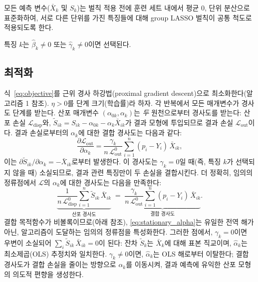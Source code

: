 \documentclass[a4paper,11pt]{article}
\begin{document}
모든 예측 변수($\bar X_k$ 및 $S_k$)는 벌칙 적용 전에 훈련 세트 내에서 평균 0, 단위 분산으로 표준화하여, 서로 다른 단위를 가진 특징들에 대해 group LASSO 벌칙이 공통 척도로 적용되도록 한다.

특징 $k$는 $\hat\beta_k \neq 0$ 또는 $\hat\gamma_k \neq 0$이면 선택된다.

\subsection{최적화}\label{sec:optimization}

식~\eqref{eq:objective}를 근위 경사 하강법(proximal gradient descent)으로 최소화한다(알고리즘 1 참조).
$\eta > 0$를 단계 크기(학습률)라 하자.
각 반복에서 모든 매개변수가 경사도 단계를 받는다.
산포 매개변수 $(\alpha_{0k}, \alpha_k)$는 \emph{두} 원천으로부터 경사도를 받는다: 산포 손실 $\mathcal{L}_{\mathrm{disp}}$와, $\tilde S_{ik} = S_{ik} - \alpha_{0k} - \alpha_k \bar X_{ik}$가 결과 모형에 투입되므로 결과 손실 $\mathcal{L}_{\mathrm{out}}$이다.
결과 손실로부터의 $\alpha_k$에 대한 결합 경사도는 다음과 같다:
\[
  \frac{\partial \mathcal{L}_{\mathrm{out}}}{\partial \alpha_k}
  = \frac{\gamma_k}{n\,\mathcal{L}_{\mathrm{out}}^0} \sum_{i=1}^n (p_i - Y_i)\,\bar X_{ik},
\]
이는 $\partial \tilde S_{ik}/\partial \alpha_k = -\bar X_{ik}$로부터 발생한다.
이 경사도는 $\gamma_k = 0$일 때(즉, 특징 $k$가 선택되지 않을 때) 소실되므로, 결과 관련 특징만이 두 손실을 결합시킨다.
더 정확히, 임의의 정류점에서 $\mathcal{L}$의 $\alpha_k$에 대한 경사도는 다음을 만족한다:
\begin{equation}\label{eq:stationary_alpha}
  \underbrace{\frac{1}{n\,\mathcal{L}_{\mathrm{disp}}^0}\sum_{i=1}^n \tilde S_{ik}\,\bar X_{ik}}_{\text{산포 경사도}}
  \;=\;
  \underbrace{\frac{\gamma_k}{n\,\mathcal{L}_{\mathrm{out}}^0}\sum_{i=1}^n (p_i - Y_i)\,\bar X_{ik}}_{\text{결합 경사도}}.
\end{equation}
결합 목적함수가 비볼록이므로(아래 참조), \eqref{eq:stationary_alpha}는 유일한 전역 해가 아닌, 알고리즘이 도달하는 임의의 정류점을 특성화한다.
그러한 점에서, $\gamma_k = 0$이면 우변이 소실되어 $\sum_i \tilde S_{ik}\,\bar X_{ik} = 0$이 된다: 잔차 $\tilde S_k$는 $\bar X_k$에 대해 표본 직교이며, $\hat\alpha_k$는 최소제곱(OLS) 추정치와 일치한다.
$\gamma_k \neq 0$이면, $\hat\alpha_k$는 OLS 해로부터 이탈한다; 결합 경사도가 결합 손실을 줄이는 방향으로 $\alpha_k$를 이동시켜, 결과 예측에 유익한 산포 모형의 의도적 편향을 생성한다.
\end{document}
